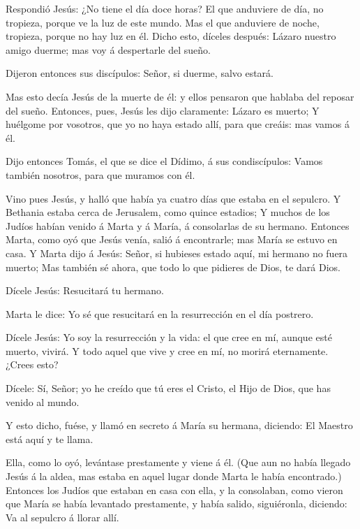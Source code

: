  Respondió Jesús: ¿No tiene el día doce horas? El que
anduviere de día, no tropieza, porque ve la luz de este mundo.
 Mas el que anduviere de noche, tropieza, porque no hay luz
en él.  Dicho esto, díceles después: Lázaro nuestro amigo
duerme; mas voy á despertarle del sueño.

 Dijeron entonces sus discípulos: Señor, si duerme, salvo
estará.

 Mas esto decía Jesús de la muerte de él: y ellos pensaron
que hablaba del reposar del sueño.  Entonces, pues, Jesús
les dijo claramente: Lázaro es muerto;  Y huélgome por
vosotros, que yo no haya estado allí, para que creáis: mas vamos á él.

 Dijo entonces Tomás, el que se dice el Dídimo, á sus
condiscípulos: Vamos también nosotros, para que muramos con él.

 Vino pues Jesús, y halló que había ya cuatro días que
estaba en el sepulcro.  Y Bethania estaba cerca de
Jerusalem, como quince estadios;  Y muchos de los Judíos
habían venido á Marta y á María, á consolarlas de su hermano.
 Entonces Marta, como oyó que Jesús venía, salió á
encontrarle; mas María se estuvo en casa.  Y Marta dijo á
Jesús: Señor, si hubieses estado aquí, mi hermano no fuera muerto;
 Mas también sé ahora, que todo lo que pidieres de Dios, te
dará Dios.

 Dícele Jesús: Resucitará tu hermano.

 Marta le dice: Yo sé que resucitará en la resurrección en
el día postrero.

 Dícele Jesús: Yo soy la resurrección y la vida: el que
cree en mí, aunque esté muerto, vivirá.  Y todo aquel que
vive y cree en mí, no morirá eternamente. ¿Crees esto?

 Dícele: Sí, Señor; yo he creído que tú eres el Cristo, el
Hijo de Dios, que has venido al mundo.

 Y esto dicho, fuése, y llamó en secreto á María su
hermana, diciendo: El Maestro está aquí y te llama.

 Ella, como lo oyó, levántase prestamente y viene á él.
 (Que aun no había llegado Jesús á la aldea, mas estaba en
aquel lugar donde Marta le había encontrado.)  Entonces los
Judíos que estaban en casa con ella, y la consolaban, como vieron que
María se había levantado prestamente, y había salido, siguiéronla,
diciendo: Va al sepulcro á llorar allí.

